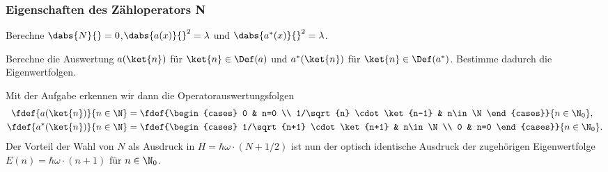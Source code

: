 \documentclass{subfiles}
\begin{document}
    \subsubsection*{Eigenschaften des Zähloperators N}
        \begin{Aufgabe}
            \nr{} Berechne $\dabs{N}{} = 0$,$\dabs{a(x)}{}^2 = \lambda$ und $\dabs{a^*(x)}{}^2 = \lambda$. 

            \nr{} Berechne die Auswertung $a(\ket{n})$ für $\ket{n}\in\Def(a)$ und $a^*(\ket{n})$ für $\ket{n}\in\Def(a^*)$. Bestimme dadurch die Eigenwertfolgen. 
        \end{Aufgabe}

        Mit der Aufgabe erkennen wir dann die Operatorauswertungsfolgen
        \begin{align*}
            \fdef{a(\ket{n})}{n\in\N} &= \fdef{\begin{cases}
                0 & n=0 \\
                1/\sqrt{n} \cdot \ket{n-1} & n\in\N
            \end{cases}}{n\in\N_0}, \\
            \fdef{a^*(\ket{n})}{n\in\N} &= \fdef{\begin{cases}
                1/\sqrt{n+1} \cdot \ket{n+1} & n\in\N \\
                0 & n=0
            \end{cases}}{n\in\N_0}.
        \end{align*}
        Der Vorteil der Wahl von $N$ als Ausdruck in $H = \hbar\omega\cdot(N + 1/2)$ ist nun der optisch identische Ausdruck der zugehörigen Eigenwertfolge $E(n) = \hbar\omega\cdot (n+1)$ für $n\in\N_0$. 
\end{document}
